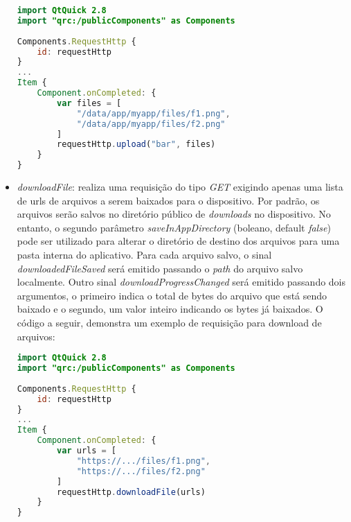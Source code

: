 \begin{itemize}
\begin{center}
\begin{lstlisting}[language=qml]
import QtQuick 2.8
import "qrc:/publicComponents" as Components
	
Components.RequestHttp {
	id: requestHttp
}
...
Item {
	Component.onCompleted: {
		var files = [
			"/data/app/myapp/files/f1.png",
			"/data/app/myapp/files/f2.png"
		]
		requestHttp.upload("bar", files)
	}
}
\end{lstlisting}
\end{center}


	\item \textit{downloadFile}: realiza uma requisição do tipo \textit{GET} exigindo apenas uma lista de urls de arquivos a serem baixados para o dispositivo. Por padrão, os arquivos serão salvos no diretório público de \textit{downloads} no dispositivo. No entanto, o segundo parâmetro \textit{saveInAppDirectory} (boleano, default \textit{false}) pode ser utilizado para alterar o diretório de destino dos arquivos para uma pasta interna do aplicativo. Para cada arquivo salvo, o sinal \textit{downloadedFileSaved} será emitido passando o \textit{path} do arquivo salvo localmente. Outro sinal \textit{downloadProgressChanged} será emitido passando dois argumentos, o primeiro indica o total de bytes do arquivo que está sendo baixado e o segundo, um valor inteiro indicando os bytes já baixados. O código a seguir, demonstra um exemplo de requisição para download de arquivos:

\begin{center}
\begin{lstlisting}[language=qml]
import QtQuick 2.8
import "qrc:/publicComponents" as Components
	
Components.RequestHttp {
	id: requestHttp
}
...
Item {
	Component.onCompleted: {
		var urls = [
			"https://.../files/f1.png",
			"https://.../files/f2.png"
		]
		requestHttp.downloadFile(urls)
	}
}
\end{lstlisting}
\end{center}

\end{itemize}

